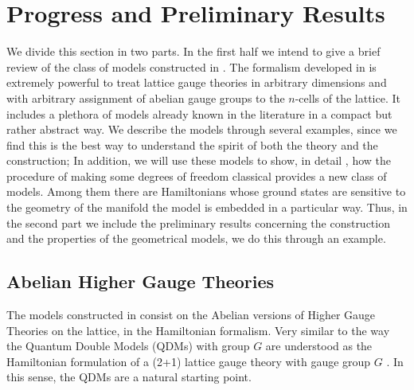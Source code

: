 \documentclass[titlepage,11pt]{article}
\theoremstyle{plain}%
\theoremstyle{definition}
\theoremstyle{remark}
\begin{document}
\section{Progress and Preliminary Results}
We divide this section in two parts. In the first half we intend to give a brief review of the class of models constructed in \cite{higher}. The formalism developed in \cite{higher} is extremely powerful to treat lattice gauge theories in arbitrary dimensions and with arbitrary assignment of abelian gauge groups to the $n$-cells of the lattice. It includes a plethora of models already known in the literature in a compact but rather abstract way. We describe the models through several examples, since we find this is the best way to understand the spirit of both the theory and the construction; In addition, we will use these models to show, in detail , how the procedure of making some degrees of freedom classical provides a new class of models. Among them there are Hamiltonians whose ground states are sensitive to the geometry of the manifold the model is embedded in a particular way. Thus, in the second part we include the preliminary results concerning the construction and the properties of the geometrical models, we do this through an example.


\subsection{Abelian Higher Gauge Theories}
The models constructed in \cite{higher} consist on the Abelian versions of Higher Gauge Theories on the lattice, in the Hamiltonian formalism. Very similar to the way the Quantum Double Models (QDMs) with  group $G$ are understood as the Hamiltonian formulation of a (2+1) lattice gauge theory with gauge group $G$ \cite{Bais,Dijkgraaf90}. In this sense, the QDMs are a natural starting point.
\end{document}
